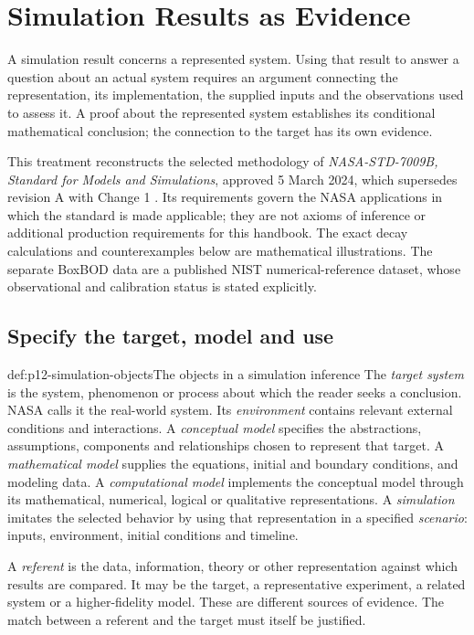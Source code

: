 \chapter{Simulation Results as Evidence}
\label{sec:p12-simulation-results-as-evidence}

A simulation result concerns a represented system. Using that result to
answer a question about an actual system requires an argument connecting
the representation, its implementation, the supplied inputs and the
observations used to assess it. A proof about the represented system
establishes its conditional mathematical conclusion; the connection to
the target has its own evidence.

This treatment reconstructs the selected methodology of
\emph{NASA-STD-7009B, Standard for Models and Simulations}, approved
5 March 2024, which supersedes revision A with Change 1
\cite[title, Sections 1.1--1.3 and 3.2]{NASA7009B2024}.
Its requirements govern the NASA applications in which the standard is
made applicable; they are not axioms of inference or additional production
requirements for this handbook. The exact decay calculations and
counterexamples below are mathematical illustrations. The separate
BoxBOD data are a published NIST numerical-reference dataset, whose
observational and calibration status is stated explicitly.

\section{Specify the target, model and use}

\begin{hbdefinition}{def:p12-simulation-objects}{The objects in a simulation inference}
The \emph{target system} is the system, phenomenon or process about
which the reader seeks a conclusion. NASA calls it the real-world
system. Its \emph{environment} contains relevant external conditions
and interactions. A \emph{conceptual model} specifies the abstractions,
assumptions, components and relationships chosen to represent that
target. A \emph{mathematical model} supplies the equations, initial and
boundary conditions, and modeling data. A \emph{computational model}
implements the conceptual model through its mathematical, numerical,
logical or qualitative representations. A \emph{simulation} imitates
the selected behavior by using that representation in a specified
\emph{scenario}: inputs, environment, initial conditions and timeline.

A \emph{referent} is the data, information, theory or other representation
against which results are compared. It may be the target, a representative
experiment, a related system or a higher-fidelity model. These are
different sources of evidence. The match between a referent and the
target must itself be justified.
\cite[Section 3.2]{NASA7009B2024}
\end{hbdefinition}

